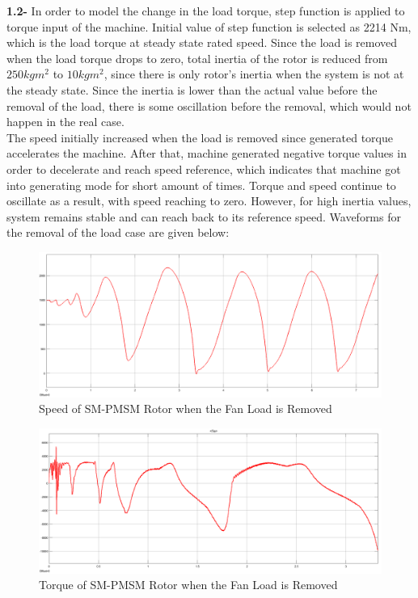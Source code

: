 \documentclass{article}
\newcommand\tab[1][1cm]{\hspace*{#1}}
\begin{document}
\newline \textbf{1.2-} In order to model the change in the load torque, step function is applied to torque input of the machine. Initial value of step function is selected as 2214 Nm, which is the load torque at steady state rated speed. Since the load is removed when the load torque drops to zero, total inertia of the rotor is reduced from $250 kg m^2$ to $10 kg m^2$, since there is only rotor's inertia when the system is not at the steady state. Since the inertia is lower than the actual value before the removal of the load, there is some oscillation before the removal, which would not happen in the real case.\\
\tab The speed initially increased when the load is removed since generated torque accelerates the machine. After that, machine generated negative torque values in order to decelerate and reach speed reference, which indicates that machine got into generating mode for short amount of times. Torque and speed continue to oscillate as a result, with speed reaching to zero. However, for high inertia values, system remains stable and can reach back to its reference speed. Waveforms for the removal of the load case are given below:
\begin{figure}[H]
    \centering
    \includegraphics[scale=0.2]{q2_speed.png}
    \caption{Speed of SM-PMSM Rotor when the Fan Load is Removed }
    \label{fig:my_label}
\end{figure}

\begin{figure}[H]
    \centering
    \includegraphics[scale=0.2]{q2_torque.png}
    \caption{Torque of SM-PMSM Rotor when the Fan Load is Removed }
    \label{fig:my_label}
\end{figure}
\end{document}
